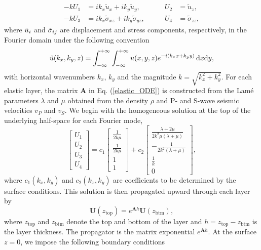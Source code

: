 \documentclass[11pt]{article}
\begin{document}
\begin{large}
\begin{equation}
\begin{aligned}
    -kU_1 &= ik_x \tilde{u}_x + ik_y \tilde{u}_y, \qquad & U_2 &= \tilde{u}_z, \\
    -kU_3 &= ik_x \tilde{\sigma}_{xz} + ik_y \tilde{\sigma}_{yz}, \qquad & U_4 &= \tilde{\sigma}_{zz},
\end{aligned}
\label{eq:def_psv}
\end{equation}
where $\Tilde{u}_i$ and $\Tilde{\sigma}_{ij}$ are displacement and stress components, respectively, in the Fourier domain under the following convention
\begin{equation}
    \Tilde{u}(k_x, k_y, z) = \int_{-\infty}^{+\infty} \int_{-\infty}^{+\infty} u(x,y,z)e^{-i(k_x x + k_y y)} \,\mathrm{d}x\mathrm{d}y,
\end{equation}
with horizontal wavenumbers $k_x$, $k_y$ and the magnitude $k = \sqrt{k_x^2 + k_y^2}$. For each elastic layer, the matrix $\mathbf{A}$ in Eq. (\ref{elastic_ODE}) is constructed from the Lam\'e parameters $\lambda$ and $\mu$ obtained from the density $\rho$ and P- and S-wave seismic velocities $v_P$ and $v_S$. We begin with the homogeneous solution at the top of the underlying half-space for each Fourier mode,
\begin{equation}
    \begin{bmatrix}
        U_1 \\ U_2 \\ U_3 \\ U_4
    \end{bmatrix} = c_1 \begin{bmatrix}
        \frac{1}{2k\mu} \\ \frac{1}{2k\mu} \\ 1 \\ 1
    \end{bmatrix} + c_2 \begin{bmatrix}
        \frac{\lambda+2\mu}{2k^2 \mu(\lambda+\mu)} \\ -\frac{1}{2k^2 (\lambda+\mu)} \\ \frac{1}{k} \\ 0
    \end{bmatrix},
\label{eq:initial}
\end{equation}
where $c_1(k_x, k_y)$ and $c_2(k_x,k_y)$ are coefficients to be determined by the surface conditions. This solution is then propagated upward through each layer by
\begin{equation}
    \mathbf{U}(z_{\text{top}}) = e^{\mathbf{A}h}\mathbf{U}(z_{\text{btm}}),
\end{equation}
where $z_{\text{top}}$ and $z_{\text{btm}}$ denote the top and bottom of the layer and $h = z_{\text{top}} - z_{\text{btm}}$ is the layer thickness. The propagator is the matrix exponential $e^{\mathbf{A}h}$. At the surface $z=0$, we impose the following boundary conditions

\end{large}
\end{document}
